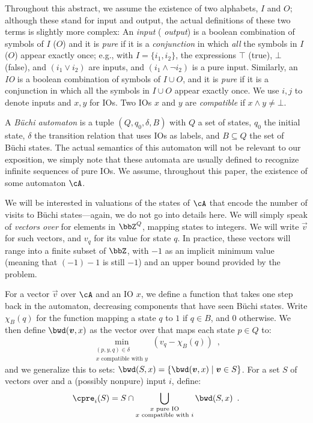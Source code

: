 \documentclass[runningheads,a4paper]{llncs}
\begin{document}
Throughout this abstract, we assume the existence of two alphabets, \(I\) and
\(O\); although these stand for input and output, the actual definitions of
these two terms is slightly more complex: An \emph{input} (\resp
\emph{output}) is a boolean combination of symbols of \(I\) (\resp $O$) and it
is \emph{pure} if it is a \emph{conjunction} in which \emph{all} the symbols
in \(I\) (\resp $O$) appear exactly once; e.g., with \(I = \{i_1, i_2\}\), the
expressions \(\top\) (true), \(\bot\) (false), and \((i_1 \lor i_2)\) are
inputs, and \((i_1 \land \neg i_2)\) is a pure input. Similarly, an \emph{IO}
is a boolean combination of symbols of \(I \cup O\), and it is \emph{pure} if
it is a conjunction in which all the symbols in \(I \cup O\) appear exactly
once.  We use \(i, j\) to denote inputs and \(x, y\) for IOs.  Two IOs \(x\)
and \(y\) are \emph{compatible} if \(x \land y \neq \bot\).

A \emph{Büchi automaton} \cA is a tuple \((Q, q_0, \delta, B)\) with \(Q\) a
set of states, \(q_0\) the initial state, \(\delta\) the transition relation
that uses IOs as labels, and \(B \subseteq Q\) the set of Büchi states.  The
actual semantics of this automaton will not be relevant to our exposition, we
simply note that these automata are usually defined to recognize infinite
sequences of pure IOs.  We assume, throughout this paper, the existence of
some automaton \(\cA\).

We will be interested in valuations of the states of \(\cA\) that encode the
number of visits to
Büchi states---again, we do not go into details
here.  We will simply speak of \emph{vectors over \cA} for elements in
\(\bbZ^Q\), mapping states to integers.  We will write \(\vec{v}\) for such vectors,
and \(v_q\) for its value for state \(q\).  In practice, these vectors will range
into a finite subset of \(\bbZ\), with \(-1\) as an implicit minimum value (meaning
that \((-1) - 1\) is still \(-1\)) and an upper bound provided by the problem.

For a vector \(\vec{v}\) over \(\cA\) and an IO \(x\), we define a function that takes
one step back in the automaton, decreasing components that have seen Büchi
states.  Write \(\chi_B(q)\) for the function mapping a state \(q\) to \(1\) if
\(q \in B\), and \(0\) otherwise.  We then define \(\bwd(\vec{v}, x)\) as the vector
over \cA that maps each state \(p \in Q\) to:
\[\min_{\substack{(p, y, q) \in \delta\\ x \text{ compatible with } y}} \left(v_q -
  \chi_B(q)\right)\enspace,\]
and we generalize this to sets: \(\bwd(S, x) = \{\bwd(\vec{v}, x) \mid \vec{v}
\in S\}\).
%
For a set \(S\) of vectors over \cA and a (possibly nonpure) input \(i\), define:
\[\cpre_i(S) = S \cap \bigcup_{\substack{x \text{ pure IO}\\x \text{ compatible with } i}} \bwd(S, x)\enspace.\]
\end{document}
